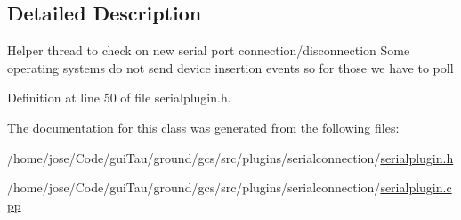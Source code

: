 \subsection{Detailed Description}
Helper thread to check on new serial port connection/disconnection Some operating systems do not send device insertion events so for those we have to poll 

Definition at line 50 of file serialplugin.\-h.



The documentation for this class was generated from the following files\-:\begin{DoxyCompactItemize}
\item 
/home/jose/\-Code/gui\-Tau/ground/gcs/src/plugins/serialconnection/\hyperlink{serialplugin_8h}{serialplugin.\-h}\item 
/home/jose/\-Code/gui\-Tau/ground/gcs/src/plugins/serialconnection/\hyperlink{serialplugin_8cpp}{serialplugin.\-cpp}\end{DoxyCompactItemize}
